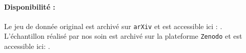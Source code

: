 		\paragraph{Disponibilité :}
		Le jeu de donnée original est archivé sur \texttt{arXiv} et est accessible ici : \cite{scialom-etal:2020:mlsum-multilingual-summarization}.
		L'échantillon réalisé par nos soin est archivé sur la plateforme \texttt{Zenodo} et est accessible ici: \cite{schild-adler:2023:subset-mlsum-multilingual}.